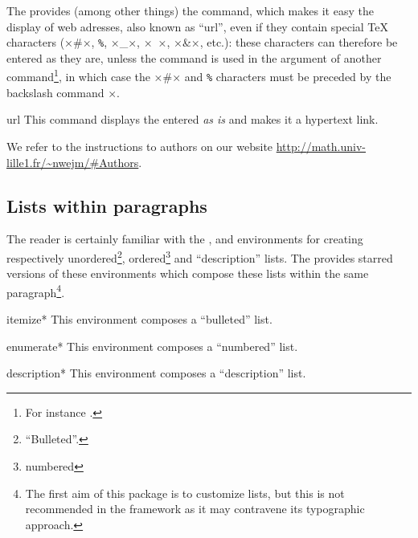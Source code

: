 \documentclass[english,nolocaltoc]{nwejmart}
\newtheorem[style=definition]{fact}
\newtheorem[title=experience]{experience}
\newtheorem[title-plural=rings]{ring}
\newtheorem[title=ideal,title-plural=ideals]{ideal}
\begin{document}
The  provides (among other things) the 
command, which makes it easy the display of web adresses, also known
as \enquote{\gls{url}}, even if they contain special \TeX{} characters (×#×,
%
\lstinline[commentstyle={}]+%+,
%
×_×, ×~×, ×&×, etc.): these characters can therefore be entered as
they are, unless the   command is used in the argument of
another command\footnote{For instance
  \protect{}.}, in which case the ×#× and
%
\lstinline[commentstyle={}]+%+
%
characters must be preceded by the backslash command ×\×.

\begin{docCommand}{url}{}
  This command displays  the  entered  \emph{as is}
  and makes it a hypertext link.
\begin{bodycode}[listing and text,listing options={alsolanguage={[hyperref]TeX},deletekeywords={[2]url}}]
We refer to the instructions to authors on our website
\url{http://math.univ-lille1.fr/~nwejm/#Authors}.
\end{bodycode}
\end{docCommand}

\subsection{Lists  within paragraphs}
\label{sec:listes-en-ligne}

The reader is certainly familiar with the ,  and
 environments for creating respectively
unordered\footnote{\enquote{Bulleted}.}, ordered\footnote{\Ie*{}
  numbered} and \enquote{description} lists. The 
provides starred versions of these environments which compose these
lists within the same paragraph\footnote{The first aim of this package
  is to customize lists, but this is not recommended in the \nwejm{}
  framework as it may contravene its typographic approach.}.

\begin{docEnvironment}[doclang/environment content=list]{itemize*}{}
  This environment composes a \enquote{bulleted} list.
\end{docEnvironment}
\begin{docEnvironment}[doclang/environment content=list]{enumerate*}{}
   This environment composes a \enquote{numbered} list. 
\end{docEnvironment}
\begin{docEnvironment}[doclang/environment content=list]{description*}{}
   This environment composes a \enquote{description} list.
\end{docEnvironment}
\end{document}
